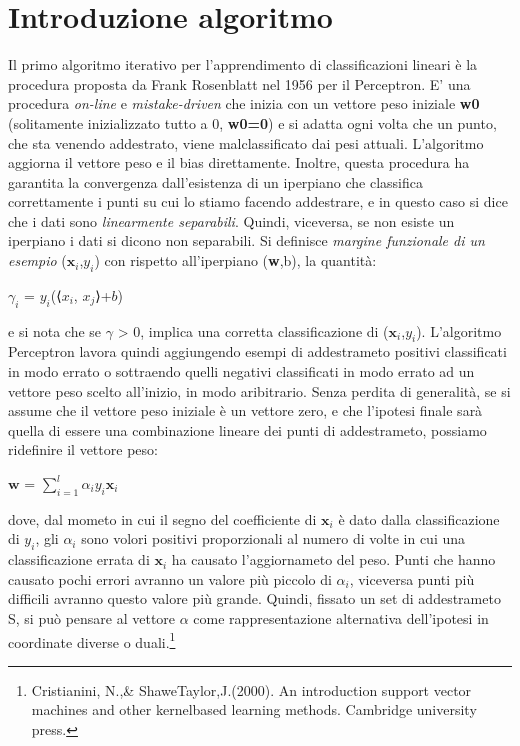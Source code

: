 \documentclass{article}
\begin{document}
	\section{Introduzione algoritmo}
	Il primo algoritmo iterativo per l'apprendimento di classificazioni lineari è la procedura proposta da Frank Rosenblatt nel 1956 per il Perceptron. E' una procedura \textit{on-line} e \textit{mistake-driven}
	che inizia con un vettore peso iniziale \textbf{w0} (solitamente inizializzato tutto a 0, \textbf{w0=0}) e si adatta ogni volta che un punto, che sta venendo addestrato, viene malclassificato dai pesi attuali.
	L'algoritmo aggiorna il vettore peso e il bias direttamente. Inoltre, questa procedura ha garantita la convergenza dall'esistenza di un iperpiano che classifica correttamente i punti su cui lo stiamo facendo addestrare, e in questo
	caso si dice che i dati sono \textit{linearmente separabili}. Quindi, viceversa, se non esiste un iperpiano i dati si dicono non separabili. Si definisce \textit{margine funzionale di un esempio} ({$\textbf{x}_i$},$y_i$) con rispetto all'iperpiano (\textbf{w},b), la quantità:
	\begin{center}
		$\gamma_i$ = $y_i$(⟨$x_i$, $x_j$⟩+$b$) 
	\end{center}
	e si nota che se $\gamma$ > 0, implica una corretta classificazione di ({$\textbf{x}_i$},$y_i$).
	L'algoritmo Perceptron lavora quindi aggiungendo esempi di addestrameto positivi classificati in modo errato o sottraendo quelli negativi classificati in modo errato ad un vettore peso scelto all'inizio, in modo aribitrario.
	Senza perdita di generalità, se si assume che il vettore peso iniziale è un vettore zero, e che l'ipotesi finale sarà quella di essere una combinazione lineare dei punti di addestrameto, possiamo ridefinire il vettore peso: 
	\begin{center}
		$\textbf{w}$ = $\displaystyle\sum_{i=1}^l \alpha_iy_i\textbf{x}_i$
	\end{center}
	dove, dal mometo in cui il segno del coefficiente di $\textbf{x}_i$ è dato dalla classificazione di $y_i$, gli $\alpha_i$ sono volori positivi proporzionali al numero di volte in cui una classificazione errata di $\textbf{x}_i$ ha causato l'aggiornameto del peso.
	Punti che hanno causato pochi errori avranno un valore più piccolo di $\alpha_i$, viceversa punti più difficili avranno questo valore più grande.
	Quindi, fissato un set di addestrameto S, si può pensare al vettore \textbf{$\alpha$} come rappresentazione alternativa dell'ipotesi in coordinate diverse o duali.\footnote[1]{Cristianini, N.,\& Shawe\-Taylor,J.(2000). An introduction support vector machines and other kernel\-based learning methods. Cambridge university press.}
\end{document}

